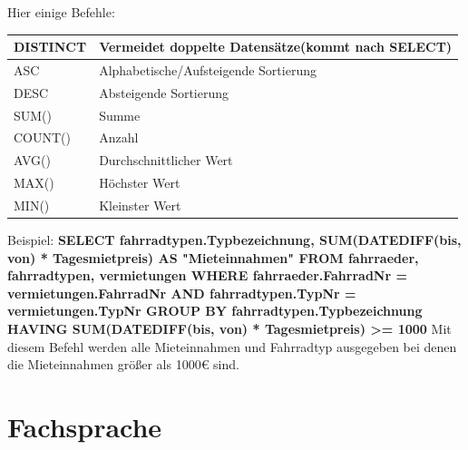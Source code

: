 \documentclass[12pt,a4paper]{article}
\begin{document}
    \noindent Hier einige Befehle:
    \begin{table}[h]
        \centering
        \renewcommand{\arraystretch}{1.5}
        \begin{tabularx}{17cm}{|l|X|}
            \hline
            \cellcolor{cyan!40!white}DISTINCT & Vermeidet doppelte Datensätze(kommt nach SELECT)\\
            \hline
            \cellcolor{cyan!40!white}ASC & Alphabetische/Aufsteigende Sortierung\\
            \hline
            \cellcolor{cyan!40!white}DESC & Absteigende Sortierung\\
            \hline
            \cellcolor{cyan!40!white}SUM() & Summe\\
            \hline
            \cellcolor{cyan!40!white}COUNT() & Anzahl\\
            \hline
            \cellcolor{cyan!40!white}AVG() & Durchschnittlicher Wert\\
            \hline
            \cellcolor{cyan!40!white}MAX() & Höchster Wert\\
            \hline
            \cellcolor{cyan!40!white}MIN() & Kleinster Wert\\
            \hline
        \end{tabularx}
    \end{table}

    \noindent Beispiel:\newline
    \textbf{SELECT fahrradtypen.Typbezeichnung, SUM(DATEDIFF(bis, von) * Tagesmietpreis) AS "Mieteinnahmen"\newline
    FROM fahrraeder, fahrradtypen, vermietungen\newline
    WHERE fahrraeder.FahrradNr = vermietungen.FahrradNr\newline
    AND fahrradtypen.TypNr = vermietungen.TypNr\newline
    GROUP BY fahrradtypen.Typbezeichnung\newline
    HAVING SUM(DATEDIFF(bis, von) * Tagesmietpreis) >= 1000}
    \vspace{0.2cm}\newline
    Mit diesem Befehl werden alle Mieteinnahmen und Fahrradtyp ausgegeben bei denen die Mieteinnahmen größer als 1000€ sind.

\section{Fachsprache}
\end{document}
